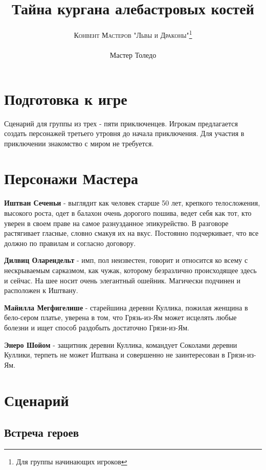 \documentclass[twoside,twocolumn]{article}
\title{Тайна кургана алебастровых костей} %
\author{\textsc{Конвент Мастеров "Львы и Драконы"}\thanks{Для группы начинающих игроков} \\[1ex] \\ %
\normalsize {Мастер Толедо}
}
\date{} 								%
\begin{document}
\renewcommand{\abstractname}{\vspace{-\baselineskip}}

\maketitle

\section{Подготовка к игре}
Сценарий для группы из трех - пяти приключенцев. Игрокам предлагается создать персонажей третьего утровня до начала приключения. Для участия в приключении знакомство с миром не требуется.

\section{Персонажи Мастера}
\textbf{Иштван Сеченьи} - выглядит как человек старше 50 лет, крепкого телосложения, высокого роста, одет в балахон очень дорогого пошива, ведет себя как тот, кто уверен в своем праве на самое разнузданное эпикурейство. В разговоре растягивает гласные, словно смакуя их на вкус. Постоянно подчеркивает, что все должно по правилам и согласно договору.

\textbf{Дилвиц Оларендельт} - имп, пол неизвестен, говорит и относится ко всему с нескрываемым сарказмом, как чужак, которому безразлично происходящее здесь и сейчас. На шее носит очень элегантный ошейник. Магически подчинен и расположен к Иштвану.  

\textbf{Майилла Мегфигелише} - старейшина деревни Куллика, пожилая женщина в бело-сером платье, уверена в том, что Грязь-из-Ям может исцелять любые болезни и ищет способ раздобыть достаточно Грязи-из-Ям. 

\textbf{Энеро Шойом} - защитник деревни Куллика, командует Соколами деревни Куллики, терпеть не может Иштвана и совершенно не заинтересован в Грязи-из-Ям. 

\section{Сценарий}

\subsection{Встреча героев}
\end{document}
